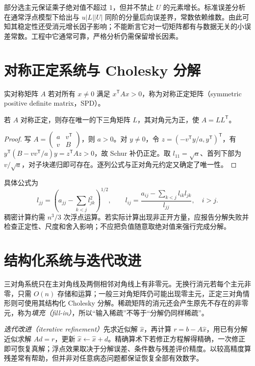 部分选主元保证乘子绝对值不超过 $1$，但并不禁止 $U$ 的元素增长。标准误差分析在通常浮点模型下给出与 $u|L||U|$ 同阶的分量后向误差界，常数依赖维数。由此可知其稳定性还受消元增长因子影响；不能断言它对一切矩阵都有与数据无关的小误差常数。工程中它通常可靠，严格分析仍需保留增长因素。

\section{对称正定系统与 Cholesky 分解}
\begin{definition}[对称正定矩阵]
实对称矩阵 $A$ 若对所有 $x\ne0$ 满足 $x^{\mathsf T}Ax>0$，称为对称正定矩阵（symmetric positive definite matrix，SPD）。
\end{definition}
\begin{theorem}[Cholesky 分解]
若 $A$ 对称正定，则存在唯一的下三角矩阵 $L$，其对角元为正，使 $A=LL^{\mathsf T}$。
\end{theorem}
\begin{proof}
写 $A=\begin{pmatrix}a&v^{\mathsf T}\\v&B\end{pmatrix}$，则 $a>0$。对 $y\ne0$，令 $z=(-v^{\mathsf T}y/a,y^{\mathsf T})^{\mathsf T}$，有 $y^{\mathsf T}(B-vv^{\mathsf T}/a)y=z^{\mathsf T}Az>0$，故 Schur 补仍正定。取 $l_{11}=\sqrt a$、首列下部为 $v/\sqrt a$，对子块递归即可存在。逐列公式与正对角元约定又确定了唯一性。
\end{proof}
具体公式为
\[
 l_{jj}=\left(a_{jj}-\sum_{k<j}l_{jk}^2\right)^{1/2},\qquad
 l_{ij}=\frac{a_{ij}-\sum_{k<j}l_{ik}l_{jk}}{l_{jj}},\quad i>j.
\]
稠密计算约需 $n^3/3$ 次浮点运算。若实际计算出现非正开方量，应报告分解失败并检查正定性、尺度和舍入影响；不应把负值随意取绝对值来强行完成分解。

\section{结构化系统与迭代改进}
三对角系统只在主对角线及两侧相邻对角线上有非零元。无换行消元若每个主元非零，只需 $O(n)$ 存储和运算；一般三对角矩阵仍可能出现零主元，正定三对角情形则可使用其结构化 Cholesky 分解。稀疏矩阵的消元还会产生原先不存在的非零元，称为\emph{填充（fill-in）}，所以“输入稀疏”不等于“分解仍同样稀疏”。

\emph{迭代改进（iterative refinement）}先求近似解 $\widehat x$，再计算 $r=b-A\widehat x$，用已有分解近似求解 $Ad=r$，更新 $\widehat x\leftarrow\widehat x+d$。精确算术下若修正方程解得精确，一次修正即可恢复真解；浮点效果取决于分解误差、条件数与残差评价精度。以较高精度算残差常有帮助，但并非对任意病态问题都保证恢复全部有效数字。

